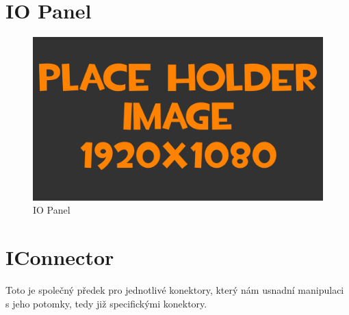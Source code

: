 
\section{IO Panel}
\begin{figure}[h!]
	\centering
	\includegraphics[width=\textwidth]{pictures/placeHolderFHD.png}
    	\caption{IO Panel}
   	\label{fig:panelIO}
\end{figure}

\section{IConnector}

Toto je společný předek pro jednotlivé konektory, který nám usnadní manipulaci s jeho potomky, tedy již specifickými konektory.
